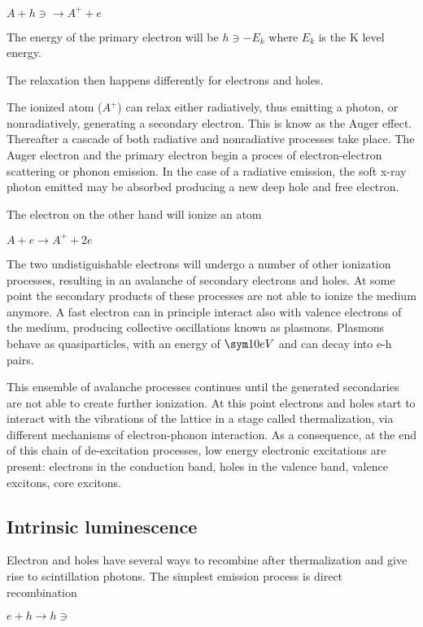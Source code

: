 $A + h\ni \rightarrow A^{+} + e$

The energy of the primary electron will be $h\ni - E_{k}$ where $E_{k}$ is the K level energy.

The relaxation then happens differently for electrons and holes. 

The ionized atom ($A^{+}$) can relax either radiatively, thus emitting a photon, or nonradiatively, generating a secondary electron. This is know as the Auger effect. Thereafter a cascade of both radiative and nonradiative processes take place.
The Auger electron and the primary electron begin a proces of electron-electron scattering or phonon emission. In the case of a radiative emission, the soft x-ray photon emitted may be absorbed producing a new deep hole and free electron. 

The electron on the other hand will ionize an atom

$A + e \rightarrow A^{+} + 2e$

The two undistiguishable electrons will undergo a number of other ionization processes, resulting in an avalanche of secondary electrons and holes. At some point the secondary products of these processes are not able to ionize the medium anymore.
A fast electron can in principle interact also with valence electrons of the medium, producing collective oscillations known as plasmons. Plasmons behave as quasiparticles, with an energy of $\sym 10 eV$ and can decay into e-h pairs.

This ensemble of avalanche processes continues until the generated secondaries are not able to create further ionization. At this point electrons and holes start to interact with the vibrations of the lattice in a stage called thermalization, via different mechanisms of electron-phonon interaction. 
 As a consequence, at the end of this chain of de-excitation processes, low energy electronic excitations are present: electrons in the conduction band, holes in the valence band, valence excitons, core excitons.
 
\subsection{Intrinsic luminescence}

Electron and holes have several ways to recombine after thermalization and give rise to scintillation photons.
The simplest emission process is direct recombination

$e + h \rightarrow h\ni$

